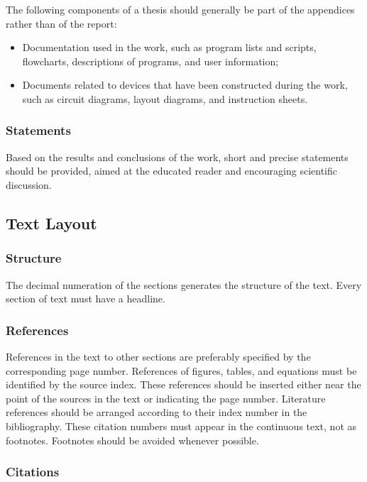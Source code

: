 The following components of a thesis should generally be part of the appendices rather than of the report:
\begin{itemize}
  \item Documentation used in the work, such as program lists and scripts, flowcharts, descriptions of programs, and user information;
  \item Documents related to devices that have been constructed during the work, such as circuit diagrams, layout diagrams, and instruction sheets.
\end{itemize}

\subsubsection{Statements}

Based on the results and conclusions of the work, short and precise statements should be provided, aimed at the educated reader and encouraging scientific discussion.

\subsection{Text Layout}

\subsubsection{Structure}

The decimal numeration of the sections generates the structure of the text. Every section of text must have a headline.

\subsubsection{References}

References in the text to other sections are preferably specified by the corresponding page number. References of figures, tables, and equations must be identified by the source index. These references should be inserted either near the point of the sources in the text or indicating the page number. Literature references should be arranged according to their index number in the bibliography. These citation numbers must appear in the continuous text, not as footnotes. Footnotes should be avoided whenever possible.

\subsubsection{Citations}

